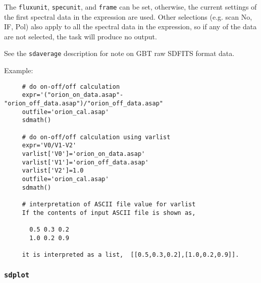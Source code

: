      The {\tt fluxunit}, {\tt specunit}, and {\tt frame} can be set, otherwise, the current
     settings of the first spectral data in the expression are used.  
     Other selections (e.g. scan No, IF, Pol) also apply to all 
     the spectral data in the expression, so if any of the data are
     not selected, the task will produce no output. 
     
     See the {\tt sdaverage} description for note on GBT raw SDFITS format data.

     Example:
\begin{verbatim}
     # do on-off/off calculation
     expr='("orion_on_data.asap"-"orion_off_data.asap")/"orion_off_data.asap"
     outfile='orion_cal.asap'
     sdmath()
     
     # do on-off/off calculation using varlist
     expr='V0/V1-V2'
     varlist['V0']='orion_on_data.asap'
     varlist['V1']='orion_off_data.asap'
     varlist['V2']=1.0
     outfile='orion_cal.asap'
     sdmath()
     
     # interpretation of ASCII file value for varlist
     If the contents of input ASCII file is shown as,

       0.5 0.3 0.2
       1.0 0.2 0.9

     it is interpreted as a list,  [[0.5,0.3,0.2],[1.0,0.2,0.9]].
\end{verbatim}


\subsubsection{{\tt sdplot}}
\label{section:sd.sdtasks.tasks.sdplot}

